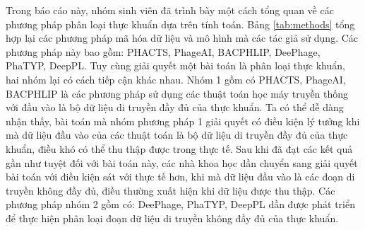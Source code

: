 \begin{table}[]
\centering
{}
\caption{Bảng tổng hợp phương pháp và mô hình các bài báo sử dụng}
\label{tab:methods}
\end{table}

Trong báo cáo này, nhóm sinh viên đã trình bày một cách tổng quan về các phương pháp phân loại thực khuẩn dựa trên tính toán. Bảng \ref{tab:methods} tổng hợp lại các phương pháp mã hóa dữ liệu và mô hình mà các tác giả sử dụng. Các phương pháp này bao gồm: PHACTS, PhageAI, BACPHLIP, DeePhage, PhaTYP, DeepPL. Tuy cùng giải quyết một bài toán là phân loại thực khuẩn, hai nhóm lại có cách tiếp cận khác nhau. Nhóm 1 gồm có PHACTS, PhageAI, BACPHLIP là các phương pháp sử dụng các thuật toán học máy truyền thống với đầu vào là bộ dữ liệu di truyền đầy đủ của thực khuẩn. Ta có thể dễ dàng nhận thấy, bài toán mà nhóm phương pháp 1 giải quyết có điều kiện lý tưởng khi mà dữ liệu đầu vào của các thuật toán là bộ dữ liệu di truyền đầy đủ của thực khuẩn, điều khó có thể thu thập được trong thực tế. Sau khi đã đạt các kết quả gần như tuyệt đối với bài toán này, các nhà khoa học dần chuyển sang giải quyết bài toán với điều kiện sát với thực tế hơn, khi mà dữ liệu đầu vào là các đoạn di truyền không đầy đủ, điều thường xuất hiện khi dữ liệu được thu thập. Các phương pháp nhóm 2 gồm có: DeePhage, PhaTYP, DeepPL dần được phát triển để thực hiện phân loại đoạn dữ liệu di truyền không đầy đủ của thực khuẩn.

